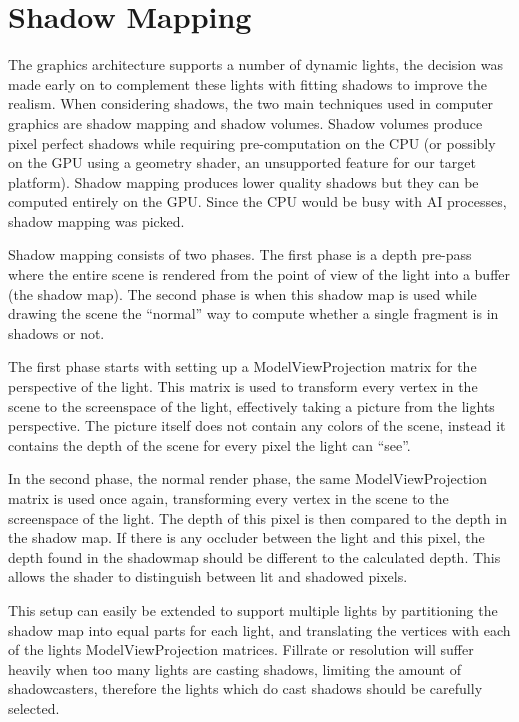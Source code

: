 \section{Shadow Mapping}
The graphics architecture supports a number of dynamic lights, the decision was made early on to complement these lights with fitting shadows to improve the realism. When considering shadows, the two main techniques used in computer graphics are shadow mapping and shadow volumes. Shadow volumes produce pixel perfect shadows while requiring pre-computation on the CPU (or possibly on the GPU using a geometry  shader, an unsupported feature for our target platform). Shadow mapping produces lower quality shadows but they can be computed entirely on the GPU. Since the CPU would be busy with AI processes, shadow mapping was picked.

Shadow mapping consists of two phases. The first phase is a depth pre-pass where the entire scene is rendered from the point of view of the light into a buffer (the shadow map). The second phase is when this shadow map is used while drawing the scene the ``normal'' way to compute whether a single fragment is in shadows or not.

The first phase starts with setting up a ModelViewProjection matrix for the perspective of the light. This matrix is used to transform every vertex in the scene to the screenspace of the light, effectively taking a picture from the lights perspective. The picture itself does not contain any colors of the scene, instead it contains the depth of the scene for every pixel the light can ``see''.

In the second phase, the normal render phase, the same ModelViewProjection matrix is used once again, transforming every vertex in the scene to the screenspace of the light. The depth of this pixel is then compared to the depth in the shadow map. If there is any occluder between the light and this pixel, the depth found in the shadowmap should be different to the calculated depth. This allows the shader to distinguish between lit and shadowed pixels.

This setup can easily be extended to support multiple lights by partitioning the shadow map into equal parts for each light, and translating the vertices with each of the lights ModelViewProjection matrices. Fillrate or resolution will suffer heavily when too many lights are casting shadows, limiting the amount of shadowcasters, therefore the lights which do cast shadows should be carefully selected.

